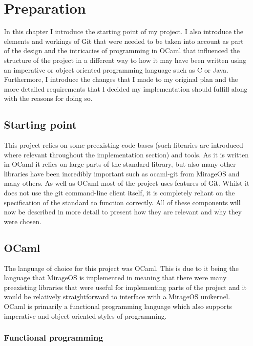 \chapter{Preparation}

 In this chapter I introduce the starting point of my project. I also introduce the elements and workings of Git that were needed to be taken into account as part of the design and the intricacies of programming in OCaml that influenced the structure of the project in a different way to how it may have been written using an imperative or object oriented programming language such as C or Java. Furthermore, I introduce the changes that I made to my original plan and the more detailed requirements that I decided my implementation should fulfill along with the reasons for doing so.

\section{Starting point}

This project relies on some preexisting code bases (such libraries are introduced where relevant throughout the implementation section) and tools. As it is written in OCaml it relies on large parts of the standard library, but also many other libraries have been incredibly important such as ocaml-git from MirageOS and many others. As well as OCaml most of the project uses features of Git. Whilst it does not use the git command-line client itself, it is completely reliant on the specification of the standard to function correctly. All of these components will now be described in more detail to present how they are relevant and why they were chosen.

\section{OCaml}

The language of choice for this project was OCaml\cite{code_ocaml}. This is due to it being the language that MirageOS is implemented in meaning that there were many preexisting libraries that were useful for implementing parts of the project and it would be relatively straightforward to interface with a MirageOS unikernel. OCaml is primarily a functional programming language which also supports imperative and object-oriented styles of programming.

\subsection{Functional programming}

